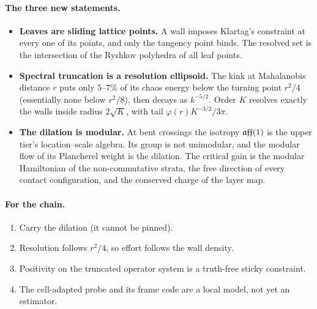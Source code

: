 \paragraph{The three new statements.}
\begin{itemize}[leftmargin=*]
\item \textbf{Leaves are sliding lattice points.} A wall imposes Klartag's constraint at every one of its points, and only the tangency
point binds. The resolved set is the intersection of the Ryshkov polyhedra of all leaf points.
\item \textbf{Spectral truncation is a resolution ellipsoid.} The kink at Mahalanobis distance $r$ puts only $5$--$7\%$ of its chaos energy below the
turning point $r^2/4$ (essentially none below $r^2/8$), then decays as $k^{-5/2}$. Order $K$ resolves exactly the walls inside radius $2\sqrt K$, with tail $\varphi(r)K^{-3/2}/3\pi$.
\item \textbf{The dilation is modular.} At bent crossings the isotropy $\mathfrak{aff}(1)$ is the upper tier's location--scale algebra. Its group is not
unimodular, and the modular flow of its Plancherel weight is the dilation. The critical gain is the modular Hamiltonian of the
non-commutative strata, the free direction of every contact configuration, and the conserved charge of the layer map.
\end{itemize}
\paragraph{For the chain.}
\begin{enumerate}[leftmargin=*]
\item Carry the dilation (it cannot be pinned).
\item Resolution follows $r^2/4$, so effort follows the wall density.
\item Positivity on the truncated operator system is a truth-free sticky constraint.
\item The cell-adapted probe and its frame code are a local model, not yet an estimator.
\end{enumerate}
